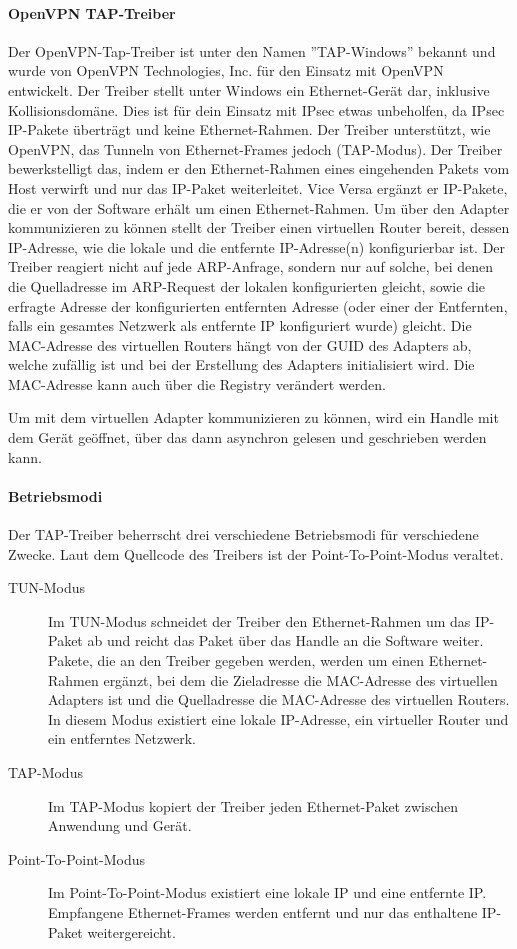 \paragraph{OpenVPN TAP-Treiber}
Der OpenVPN-Tap-Treiber ist unter den Namen ''TAP-Windows'' bekannt und wurde von
OpenVPN Technologies, Inc. für den Einsatz mit OpenVPN entwickelt.
Der Treiber stellt unter Windows ein Ethernet-Gerät dar, inklusive Kollisionsdomäne.
Dies ist für dein Einsatz mit \ac{IPsec} etwas unbeholfen, da \ac{IPsec} \ac{IP}-Pakete
überträgt und keine Ethernet-Rahmen.
Der Treiber unterstützt, wie OpenVPN, das Tunneln von Ethernet-Frames jedoch (TAP-Modus).
Der Treiber bewerkstelligt das, indem er den Ethernet-Rahmen eines eingehenden Pakets vom
Host verwirft und nur das IP-Paket weiterleitet. Vice Versa ergänzt er IP-Pakete, die er von
der Software erhält um einen Ethernet-Rahmen. Um über den Adapter kommunizieren zu können
stellt der Treiber einen virtuellen Router bereit, dessen \ac{IP}-Adresse, wie die lokale  und
die entfernte IP-Adresse(n) konfigurierbar ist.
Der Treiber reagiert nicht auf jede ARP-Anfrage, sondern nur auf solche, bei denen
die Quelladresse im ARP-Request der lokalen konfigurierten gleicht, sowie die erfragte Adresse
der konfigurierten entfernten Adresse (oder einer der Entfernten, falls ein gesamtes Netzwerk
als entfernte IP konfiguriert wurde) gleicht.
Die MAC-Adresse des virtuellen Routers hängt von der GUID des Adapters ab, welche zufällig ist
und bei der Erstellung des Adapters initialisiert wird. Die MAC-Adresse kann 
auch über die Registry verändert werden.

Um mit dem virtuellen Adapter kommunizieren zu können, wird ein Handle mit dem Gerät
geöffnet, über das dann asynchron gelesen und geschrieben werden kann.

\paragraph{Betriebsmodi}
Der TAP-Treiber beherrscht drei verschiedene Betriebsmodi für verschiedene Zwecke.
Laut dem Quellcode des Treibers ist der Point-To-Point-Modus veraltet.
\begin{description}
\item [TUN-Modus] Im TUN-Modus schneidet der Treiber den Ethernet-Rahmen um das 
IP-Paket ab und reicht das Paket über das Handle an die Software weiter. 
Pakete, die an den Treiber gegeben werden, werden um einen Ethernet-Rahmen
ergänzt, bei dem die Zieladresse die MAC-Adresse des virtuellen Adapters ist 
und die Quelladresse die MAC-Adresse des virtuellen Routers.
In diesem Modus existiert eine lokale IP-Adresse, ein virtueller Router und 
ein entferntes Netzwerk.
\item [TAP-Modus] Im TAP-Modus kopiert der Treiber jeden Ethernet-Paket zwischen 
Anwendung und Gerät.
\item [Point-To-Point-Modus] Im Point-To-Point-Modus existiert eine lokale IP 
und eine entfernte IP. Empfangene Ethernet-Frames werden entfernt und nur
das enthaltene IP-Paket weitergereicht.
\end{description}

